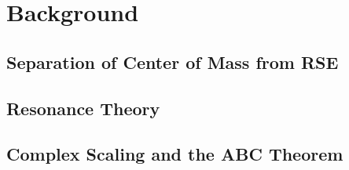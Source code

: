 \section{Background}

\subsection{Separation of Center of Mass from RSE}

\subsection{Resonance Theory}

\subsection{Complex Scaling and the ABC Theorem}
